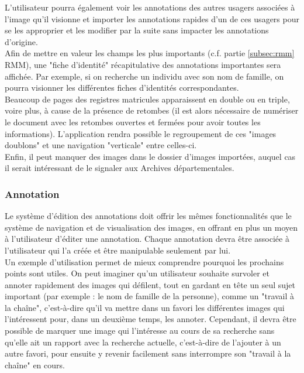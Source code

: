 \documentclass[a4paper]{article}
\begin{document}
	L'utilisateur pourra \'egalement voir les annotations des autres usagers associ\'ees \`a l'image qu'il visionne et importer les annotations rapides d'un de ces usagers pour se les approprier et les modifier par la suite sans impacter les annotations d'origine.\\

	Afin de mettre en valeur les champs les plus importants (c.f. partie \ref{subsec:rmm} RMM), une "fiche d'identit\'e" r\'ecapitulative des annotations importantes sera affich\'ee.  Par exemple, si on recherche un individu avec son nom de famille, on pourra visionner les diff\'erentes fiches d'identit\'es correspondantes.\\

	Beaucoup de pages des registres matricules apparaissent en double ou en triple, voire plus, \`a cause de la pr\'esence de retombes (il est alors n\'ecessaire de num\'eriser le document avec les retombes ouvertes et ferm\'ees pour avoir toutes les informations). L'application rendra possible le regroupement de ces "images doublons" et une navigation "verticale" entre celles-ci.\\

	Enfin, il peut manquer des images dans le dossier d'images import\'ees, auquel cas il serait int\'eressant de le signaler aux Archives d\'epartementales.

\subsubsection{Annotation}

	Le syst\`eme d'\'edition des annotations doit offrir les m\^emes fonctionnalit\'es que le syst\`eme de navigation et de visualisation des images, en offrant en plus un moyen \`a l'utilisateur d'\'editer une annotation. Chaque annotation devra \^etre associ\'ee \`a l'utilisateur qui l'a cr\'e\'ee et \^etre manipulable seulement par lui.\\
    
    Un exemple d'utilisation permet de mieux comprendre pourquoi les prochains points sont utiles. On peut imaginer qu'un utilisateur souhaite survoler et annoter rapidement des images qui d\'efilent, tout en gardant en t\^ete un seul sujet important (par exemple : le nom de famille de la personne), comme un "travail \`a la cha\^ine", c'est-\`a-dire qu'il va mettre dans un favori les diff\'erentes images qui l'int\'eressent pour, dans un deuxi\`eme temps, les annoter. Cependant, il devra \^etre possible de marquer une image qui l'int\'eresse au cours de sa recherche sans qu'elle ait un rapport avec la recherche actuelle, c'est-\`a-dire de l'ajouter \`a un autre favori, pour ensuite y revenir facilement sans interrompre son "travail \`a la cha\^ine" en cours.\\
 
\end{document}
